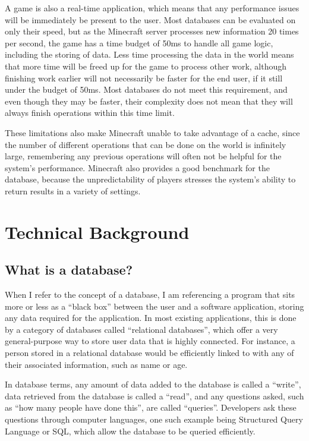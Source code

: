 \documentclass[10pt,twocolumn]{article}
\begin{document}
A game is also a real-time application, which means that any performance issues
will be immediately be present to the user. Most databases can be evaluated on
only their speed, but as the Minecraft server processes new information 20 times
per second, the game has a time budget of 50ms to handle all game logic,
including the storing of data. Less time processing the data in the world means
that more time will be freed up for the game to process other work, although
finishing work earlier will not necessarily be faster for the end user, if it
still under the budget of 50ms. Most databases do not meet this requirement, and
even though they may be faster, their complexity does not mean that they will
always finish operations within this time limit.

These limitations also make Minecraft unable to take advantage of a cache, since
the number of different operations that can be done on the world is infinitely
large, remembering any previous operations will often not be helpful for the
system's performance. Minecraft also provides a good benchmark for the database,
because the unpredictability of players stresses the system's ability to return
results in a variety of settings.

\section{Technical Background}

\subsection{What is a database?}
When I refer to the concept of a database, I am referencing a program that sits
more or less as a ``black box'' between the user and a software application,
storing any data required for the application. In most existing applications,
this is done by a category of databases called ``relational databases'', which
offer a very general-purpose way to store user data that is highly connected.
For instance, a person stored in a relational database would be efficiently
linked to with any of their associated information, such as name or age.

In database terms, any amount of data added to the database is called a
``write'', data retrieved from the database is called a ``read'', and any
questions asked, such as ``how many people have done this'', are called
``queries''. Developers ask these questions through computer languages, one such
example being Structured Query Language or SQL, which allow
the database to be queried efficiently.
\end{document}
